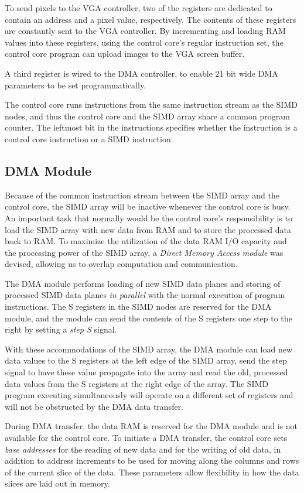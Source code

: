 
To send pixels to the \ac{VGA} controller, two of the registers are dedicated to
contain an address and a pixel value, respectively. The contents of these
registers are constantly sent to the \ac{VGA} controller. By incrementing and
loading \ac{RAM} values into these registers, using the control core's regular
instruction set, the control core program can upload images to the \ac{VGA}
screen buffer.

A third register is wired to the \ac{DMA} controller, to enable 21 bit wide
\ac{DMA} parameters to be set programmatically.

The control core runs instructions from the same instruction stream as the
\ac{SIMD} nodes, and thus the control core and the \ac{SIMD} array share a
common program counter. The leftmost bit in the instructions specifies whether
the instruction is a control core instruction or a \ac{SIMD} instruction.

\subsection{DMA Module}

Because of the common instruction stream between the \ac{SIMD} array and the
control core, the \ac{SIMD} array will be inactive whenever the control core is
busy. An important task that normally would be the control core's responsibility
is to load the \ac{SIMD} array with new data from \ac{RAM} and to store the
processed data back to \ac{RAM}. To maximize the utilization of the data
\ac{RAM} \ac{I/O} capacity and the processing power of the \ac{SIMD} array, a
\emph{Direct Memory Access module} was devised, allowing us to overlap
computation and communication.

The \ac{DMA} module performs loading of new \ac{SIMD} data planes and storing of
processed \ac{SIMD} data planes \emph{in parallel} with the normal execution of
program instructions. The S registers in the \ac{SIMD} nodes are reserved for
the \ac{DMA} module, and the module can send the contents of the S registers one
step to the right by setting a \emph{step S} signal.

With these accommodations of the \ac{SIMD} array, the \ac{DMA} module can load
new data values to the S registers at the left edge of the \ac{SIMD} array, send
the step signal to have these value propagate into the array and read the old,
processed data values from the S registers at the right edge of the array. The
\ac{SIMD} program executing simultaneously will operate on a different set of
registers and will not be obstructed by the \ac{DMA} data transfer.

During \ac{DMA} transfer, the data \ac{RAM} is reserved for the \ac{DMA} module
and is not available for the control core. To initiate a \ac{DMA} transfer, the
control core sets \emph{base addresses} for the reading of new data and for the
writing of old data, in addition to address increments to be used for moving
along the columns and rows of the current slice of the data. These parameters
allow flexibility in how the data slices are laid out in memory.
